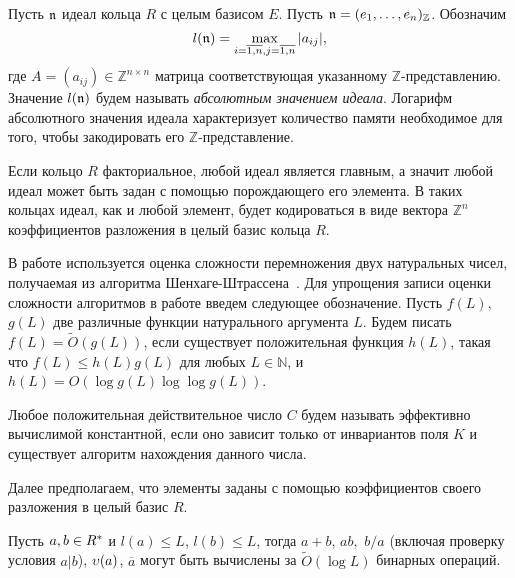 \documentclass[_00_autoref.tex]{subfiles}
\begin{document}
\begin{definition}
    Пусть $\mathfrak{n}$ идеал кольца $R$ с целым базисом $E$.
    Пусть $\mathfrak{n} = (e_1, \dots, e_n)_{\mathbb{Z}}$.
    Обозначим
    \begin{equation*}
        l(\mathfrak{n}) = \max\limits_{i = \overline{1,n}, j = \overline{1,n}} |a_{ij}|, 
    \end{equation*}
    где $A = (a_{ij}) \in \mathbb{Z}^{n \times n}$ матрица соответствующая указанному $\mathbb{Z}$-представлению.
    Значение $l(\mathfrak{n})$ будем называть \emph{абсолютным значением идеала}.
    Логарифм абсолютного значения идеала характеризует количество памяти необходимое для того, чтобы закодировать его $\mathbb{Z}$-представление.
\end{definition}

\begin{remark}
    Если кольцо $R$ факториальное, любой идеал является главным, а значит любой идеал может быть задан с помощью порождающего его элемента.
    В таких кольцах идеал, как и любой элемент, будет кодироваться в виде вектора $\mathbb{Z}^n$ коэффициентов разложения в целый базис кольца $R$.
\end{remark}

\begin{remark}
    В работе используется оценка сложности перемножения двух натуральных чисел, получаемая из алгоритма Шенхаге-Штрассена~\cite{source:Schonhage}.
    Для упрощения записи оценки сложности алгоритмов в работе введем следующее обозначение.
    Пусть $f(L),$ $g(L)$ две различные функции натурального аргумента $L$.
    Будем писать $f(L) = \tilde O(g(L))$, если существует положительная функция $h(L)$, такая что $f(L) \le h(L)g(L)$ для любых $L \in \mathbb{N}$, и $h(L) = O(\log g(L)\log \log g(L))$.
    
    Любое положительная действительное число $C$ будем называть эффективно вычислимой константной, если оно зависит только от инвариантов поля $K$ и существует алгоритм нахождения данного числа.
\end{remark}

Далее предполагаем, что элементы заданы с помощью коэффициентов своего разложения в целый базис $R$.

\begin{proposition}\label{proposition:operations}
    Пусть $a, b \in R^{*}$ и $l(a) \leq L$, $l(b) \leq L$, тогда $a + b$, $a b,$ $b/a$ (включая проверку условия $a|b$), $\upsilon(a)$, $\overline{a}$ могут быть  вычислены за $\tilde{O}(\log L)$ бинарных операций.
\end{proposition}
\end{document}
